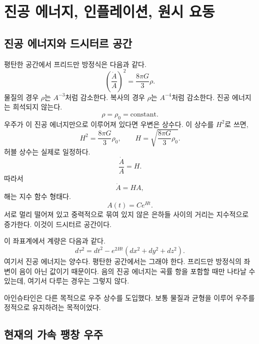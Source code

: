 \chapter{진공 에너지, 인플레이션, 원시 요동}

\section{진공 에너지와 드시터르 공간}

평탄한 공간에서 프리드만 방정식은 다음과 같다.
\begin{equation}
\left(\frac{\dot A}{A}\right)^2=\frac{8\pi G}{3}\rho.
\end{equation}
물질의 경우 \(\rho\)는 \(A^{-3}\)처럼 감소한다. 복사의 경우 \(\rho\)는 \(A^{-4}\)처럼 감소한다. 진공 에너지는 희석되지 않는다.
\begin{equation}
\rho=\rho_0=\text{constant}.
\end{equation}
우주가 이 진공 에너지만으로 이루어져 있다면 우변은 상수다. 이 상수를 \(H^2\)로 쓰면,
\begin{equation}
H^2=\frac{8\pi G}{3}\rho_0,
\qquad
H=\sqrt{\frac{8\pi G}{3}\rho_0}.
\end{equation}
허블 상수는 실제로 일정하다.
\begin{equation}
\frac{\dot A}{A}=H.
\end{equation}
따라서
\begin{equation}
\dot A=HA,
\end{equation}
해는 지수 함수 형태다.
\begin{equation}
A(t)=C e^{Ht}.
\end{equation}
서로 멀리 떨어져 있고 중력적으로 묶여 있지 않은 은하들 사이의 거리는 지수적으로 증가한다. 이것이 드시터르 공간이다.

이 좌표계에서 계량은 다음과 같다.
\begin{equation}
d\tau^2=dt^2-e^{2Ht}\left(dx^2+dy^2+dz^2\right).
\end{equation}
여기서 진공 에너지는 양수다. 평탄한 공간에서는 그래야 한다. 프리드만 방정식의 좌변이 음이 아닌 값이기 때문이다. 음의 진공 에너지는 곡률 항을 포함할 때만 나타날 수 있는데, 여기서 다루는 경우는 그렇지 않다.

아인슈타인은 다른 목적으로 우주 상수를 도입했다. 보통 물질과 균형을 이루어 우주를 정적으로 유지하려는 목적이었다.

\section{현재의 가속 팽창 우주}

